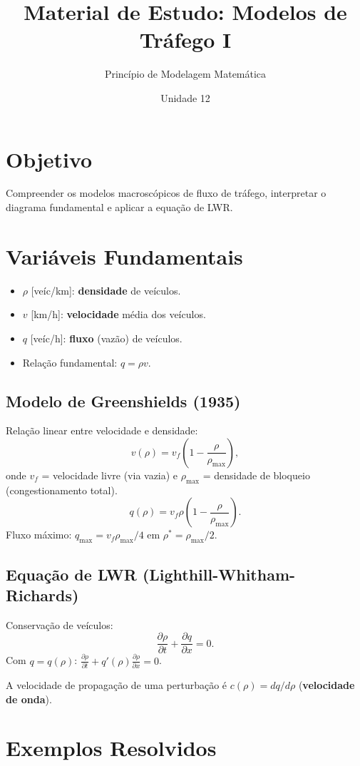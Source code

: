 \documentclass[12pt,a4paper]{article}
\title{Material de Estudo: Modelos de Tr\'afego I}
\author{Princ\'ipio de Modelagem Matem\'atica}
\date{Unidade 12}
\begin{document}
\maketitle

\section*{Objetivo}
Compreender os modelos macrosc\'opicos de fluxo de tr\'afego, interpretar o diagrama fundamental e aplicar a equa\c{c}\~ao de LWR.

\section*{Vari\'aveis Fundamentais}
\begin{itemize}
  \item $\rho$ [ve\'ic/km]: \textbf{densidade} de ve\'iculos.
  \item $v$ [km/h]: \textbf{velocidade} m\'edia dos ve\'iculos.
  \item $q$ [ve\'ic/h]: \textbf{fluxo} (vaz\~ao) de ve\'iculos.
  \item Rela\c{c}\~ao fundamental: $q = \rho v$.
\end{itemize}

\subsection*{Modelo de Greenshields (1935)}
Rela\c{c}\~ao linear entre velocidade e densidade:
\[
v(\rho) = v_f\!\left(1 - \frac{\rho}{\rho_\text{max}}\right),
\]
onde $v_f$ = velocidade livre (via vazia) e $\rho_\text{max}$ = densidade de bloqueio (congestionamento total).
\[
q(\rho) = v_f\rho\!\left(1 - \frac{\rho}{\rho_\text{max}}\right).
\]
Fluxo m\'aximo: $q_\text{max} = v_f\rho_\text{max}/4$ em $\rho^* = \rho_\text{max}/2$.

\subsection*{Equa\c{c}\~ao de LWR (Lighthill-Whitham-Richards)}
Conserva\c{c}\~ao de ve\'iculos:
\[
\frac{\partial\rho}{\partial t} + \frac{\partial q}{\partial x} = 0.
\]
Com $q = q(\rho)$: $\frac{\partial\rho}{\partial t} + q'(\rho)\frac{\partial\rho}{\partial x} = 0$.

A velocidade de propaga\c{c}\~ao de uma perturba\c{c}\~ao \'e $c(\rho) = dq/d\rho$ (\textbf{velocidade de onda}).

\section*{Exemplos Resolvidos}
\end{document}
